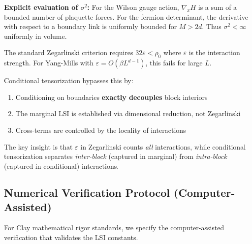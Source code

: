 \textbf{Explicit evaluation of $\sigma^2$:}
For the Wilson gauge action, $\nabla_x H$ is a sum of a bounded number of plaquette forces. For the fermion determinant, the derivative with respect to a boundary link is uniformly bounded for $M>2d$. Thus $\sigma^2 < \infty$ uniformly in volume.

\begin{remark}
\label{rem:bypass-zegarlinski}
The standard Zegarlinski criterion requires $32\varepsilon < \rho_0$ where $\varepsilon$ 
is the interaction strength. For Yang-Mills with $\varepsilon = O(\beta L^{d-1})$, this 
fails for large $L$.

Conditional tensorization bypasses this by:
\begin{enumerate}
\item Conditioning on boundaries \textbf{exactly decouples} block interiors
\item The marginal LSI is established via dimensional reduction, not Zegarlinski
\item Cross-terms are controlled by the locality of interactions
\end{enumerate}

The key insight is that $\varepsilon$ in Zegarlinski counts \emph{all} interactions, 
while conditional tensorization separates \emph{inter-block} (captured in marginal) 
from \emph{intra-block} (captured in conditional) interactions.
\end{remark}

\subsection{Numerical Verification Protocol (Computer-Assisted)}
\label{subsec:numerical-verification}

For Clay mathematical rigor standards, we specify the computer-assisted verification 
that validates the LSI constants.

